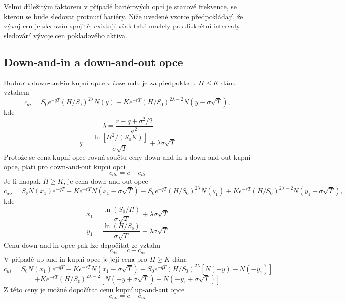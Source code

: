 \documentclass[a4paper]{book}
\begin{document}
Velmi důležitým faktorem v případě bariérových opcí je stanové frekvence, se kterou se bude sledovat protnutí bariéry. Níže uvedené vzorce předpokládají, že vývoj cen je sledován spojitě; existují však také modely pro diskrétní intervaly sledování vývoje cen pokladového aktiva.

\subsection{Down-and-in a down-and-out opce}

Hodnota down-and-in kupní opce v čase nula je za předpokladu $H \le K$ dána vztahem
\begin{equation*}
c_{di} = S_0e^{-qT}(H/S_0)^{2\lambda}N(y)-Ke^{-rT}(H/S_0)^{2\lambda-2}N(y-\sigma \sqrt{T}),
\end{equation*}
kde
\begin{equation*}
\lambda = \frac{r-q+\sigma^2/2}{\sigma^2}
\end{equation*}
\begin{equation*}
y=\frac{\ln[H^2/(S_0K)]}{\sigma \sqrt{T}}+\lambda \sigma \sqrt{T}
\end{equation*}
Protože se cena kupní opce rovná součtu ceny down-and-in a down-and-out kupní opce, platí pro down-and-out kupní opci
\begin{equation*}
c_{do}=c-c_{di}
\end{equation*}
Je-li naopak $H \ge K$, je cena down-and-out opce
\begin{equation*}
c_{do} = S_0 N(x_1)e^{-qT}-Ke^{-rT}N(x_1 - \sigma \sqrt{T})-S_0e^{-qT}(H/S_0)^{2 \lambda}N(y_1)+Ke^{-rT}(H/S_0)^{2 \lambda -2}N(y_1 - \sigma \sqrt{T}),
\end{equation*}
kde
\begin{equation*}
x_1 = \frac{\ln(S_0/H)}{\sigma \sqrt{T}}+\lambda \sigma \sqrt{T}
\end{equation*}
\begin{equation*}
y_1 = \frac{\ln(H/S_0)}{\sigma \sqrt{T}}+\lambda \sigma \sqrt{T} 
\end{equation*}
Cenu down-and-in opce pak lze dopočítat ze vztahu
\begin{equation*}
c_{di} = c - c_{di}
\end{equation*}
V případě up-and-in kupní opce je její cena pro $H \ge K$ dána
\begin{equation*}
c_{ui} = S_0 N(x_1)e^{-qT}-Ke^{-rT}N(x_1 - \sigma \sqrt{T})-S_0e^{-qT}(H/S_0)^{2\lambda}[N(-y)-N(-y_1)]
\end{equation*}
\begin{equation*}
+Ke^{-rT}(H/S_0)^{2\lambda-2}[N(-y+\sigma \sqrt{T})-N(-y_1 + \sigma \sqrt{T})]
\end{equation*}
Z této ceny je možné dopočítat cenu kupní up-and-out opce
\begin{equation*}
c_{uo} = c - c_{ui}
\end{equation*}
\end{document}
